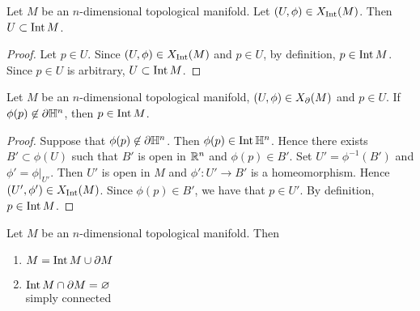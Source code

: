 \documentclass{book}
\begin{document}
		\begin{ex}
		Let $M$ be an $n$-dimensional topological manifold. Let $(U, \phi) \in X_{\operatorname{Int}}(M)$. Then $U \subset \operatorname{Int} M$.
	\end{ex}
	
	\begin{proof}
		Let $p \in U$. Since $(U, \phi) \in X_{\operatorname{Int}}(M)$ and $p \in U$, by definition, $p \in \operatorname{Int} M$. Since $p \in U$ is arbitrary, $U \subset \operatorname{Int} M$.
	\end{proof}

	\begin{ex}
		Let $M$ be an $n$-dimensional topological manifold, $(U, \phi) \in X_{\partial}(M)$ and $p \in U$. If $\phi(p) \not \in \partial \mathbb{H}^n$, then $p \in \operatorname{Int} M$.
	\end{ex}

	\begin{proof}
		Suppose that $\phi(p) \not \in \partial \mathbb{H}^n$.  Then  $\phi(p) \in \operatorname{Int} \mathbb{H}^n$. Hence there exists $B' \subset \phi(U)$ such that $B'$ is open in $\mathbb{R}^n$ and $\phi(p) \in B'$. Set $U' = \phi^{-1}(B')$ and $\phi' = \phi|_{U'}$. Then $U'$ is open in $M$ and $\phi': U' \rightarrow B'$ is a homeomorphism. Hence $(U', \phi') \in X_{\operatorname{Int}}(M)$. Since $\phi(p) \in B'$, we have that $p \in U'$. By definition, $p \in \operatorname{Int} M$.
	\end{proof}

	\begin{ex}
		Let $M$ be an $n$-dimensional topological manifold. Then 
		\begin{enumerate}
			\item $M = \operatorname{Int} M \cup \partial M $
			\item $\operatorname{Int} M \cap \partial M = \varnothing$ \\
			 simply connected
		\end{enumerate}
	\end{ex}
\end{document}
